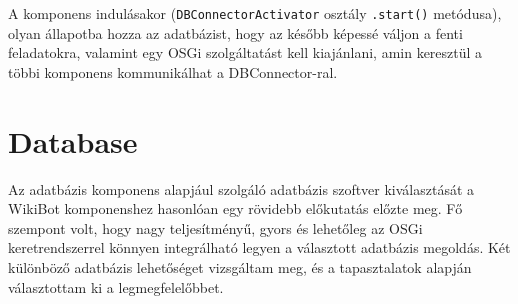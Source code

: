 A komponens indulásakor (\texttt{DBConnectorActivator} osztály \texttt{.start()} metódusa), olyan állapotba hozza az adatbázist, hogy az később képessé váljon a fenti feladatokra, valamint egy OSGi szolgáltatást kell kiajánlani, amin keresztül a többi komponens kommunikálhat a DBConnector-ral.


\section{Database}
\label{sec:db}

Az adatbázis komponens alapjául szolgáló adatbázis szoftver kiválasztását a WikiBot komponenshez hasonlóan egy rövidebb előkutatás előzte meg. Fő szempont volt, hogy nagy teljesítményű, gyors és lehetőleg az OSGi keretrendszerrel könnyen integrálható legyen a választott adatbázis megoldás. Két különböző adatbázis lehetőséget vizsgáltam meg, és a tapasztalatok alapján választottam ki a legmegfelelőbbet.

